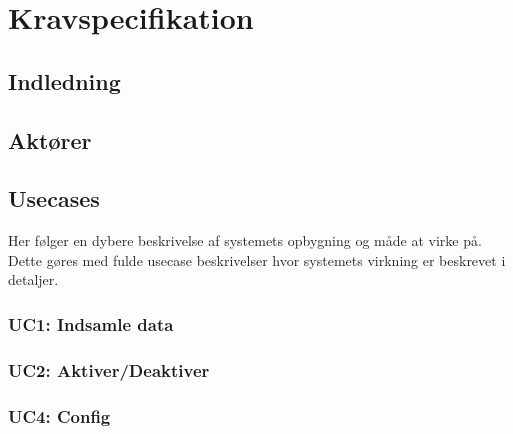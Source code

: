 \chapter{Kravspecifikation}

\clearpage


\section{Indledning}



\section{Aktører}



\section{Usecases}

Her følger en dybere beskrivelse af systemets opbygning og måde at virke på. Dette gøres med fulde usecase beskrivelser hvor systemets virkning er beskrevet i detaljer.


\subsection{UC1: Indsamle data}



\subsection{UC2: Aktiver/Deaktiver}



%


\subsection{UC4: Config}


